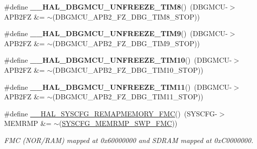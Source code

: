 \begin{DoxyCompactItemize}
\item 
\mbox{\label{group___h_a_l___exported___macros_ga7375cef18047e43c68f6bd871de40f1a}} 
\#define {\bfseries \+\_\+\+\_\+\+H\+A\+L\+\_\+\+D\+B\+G\+M\+C\+U\+\_\+\+U\+N\+F\+R\+E\+E\+Z\+E\+\_\+\+T\+I\+M8}()~(D\+B\+G\+M\+CU-\/$>$A\+P\+B2\+FZ \&= $\sim$(D\+B\+G\+M\+C\+U\+\_\+\+A\+P\+B2\+\_\+\+F\+Z\+\_\+\+D\+B\+G\+\_\+\+T\+I\+M8\+\_\+\+S\+T\+OP))
\item 
\mbox{\label{group___h_a_l___exported___macros_ga3c336afea7d87b769cee4fb059ed2477}} 
\#define {\bfseries \+\_\+\+\_\+\+H\+A\+L\+\_\+\+D\+B\+G\+M\+C\+U\+\_\+\+U\+N\+F\+R\+E\+E\+Z\+E\+\_\+\+T\+I\+M9}()~(D\+B\+G\+M\+CU-\/$>$A\+P\+B2\+FZ \&= $\sim$(D\+B\+G\+M\+C\+U\+\_\+\+A\+P\+B2\+\_\+\+F\+Z\+\_\+\+D\+B\+G\+\_\+\+T\+I\+M9\+\_\+\+S\+T\+OP))
\item 
\mbox{\label{group___h_a_l___exported___macros_gaa63c03a742fa4728b49077514189b318}} 
\#define {\bfseries \+\_\+\+\_\+\+H\+A\+L\+\_\+\+D\+B\+G\+M\+C\+U\+\_\+\+U\+N\+F\+R\+E\+E\+Z\+E\+\_\+\+T\+I\+M10}()~(D\+B\+G\+M\+CU-\/$>$A\+P\+B2\+FZ \&= $\sim$(D\+B\+G\+M\+C\+U\+\_\+\+A\+P\+B2\+\_\+\+F\+Z\+\_\+\+D\+B\+G\+\_\+\+T\+I\+M10\+\_\+\+S\+T\+OP))
\item 
\mbox{\label{group___h_a_l___exported___macros_gae6396470b3bddff9424201bf07573f19}} 
\#define {\bfseries \+\_\+\+\_\+\+H\+A\+L\+\_\+\+D\+B\+G\+M\+C\+U\+\_\+\+U\+N\+F\+R\+E\+E\+Z\+E\+\_\+\+T\+I\+M11}()~(D\+B\+G\+M\+CU-\/$>$A\+P\+B2\+FZ \&= $\sim$(D\+B\+G\+M\+C\+U\+\_\+\+A\+P\+B2\+\_\+\+F\+Z\+\_\+\+D\+B\+G\+\_\+\+T\+I\+M11\+\_\+\+S\+T\+OP))
\item 
\mbox{\label{group___h_a_l___exported___macros_ga911da0daaaa54611ad5cc53b909836ee}} 
\#define \mbox{\hyperlink{group___h_a_l___exported___macros_ga911da0daaaa54611ad5cc53b909836ee}{\+\_\+\+\_\+\+H\+A\+L\+\_\+\+S\+Y\+S\+C\+F\+G\+\_\+\+R\+E\+M\+A\+P\+M\+E\+M\+O\+R\+Y\+\_\+\+F\+MC}}()~(S\+Y\+S\+C\+FG-\/$>$M\+E\+M\+R\+MP \&= $\sim$(\mbox{\hyperlink{group___peripheral___registers___bits___definition_ga5fc9935984aa2d506eb568944cf4a45f}{S\+Y\+S\+C\+F\+G\+\_\+\+M\+E\+M\+R\+M\+P\+\_\+\+S\+W\+P\+\_\+\+F\+MC}}))
\begin{DoxyCompactList}\small\item\em F\+MC (N\+O\+R/\+R\+AM) mapped at 0x60000000 and S\+D\+R\+AM mapped at 0x\+C0000000. \end{DoxyCompactList}\item 

\end{DoxyCompactItemize}

